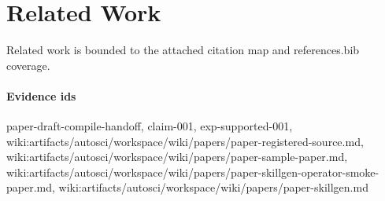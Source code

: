\section{Related Work}
Related work is bounded to the attached citation map and references.bib coverage.

\paragraph{Evidence ids} paper-draft-compile-handoff, claim-001, exp-supported-001, wiki:artifacts/autosci/workspace/wiki/papers/paper-registered-source.md, wiki:artifacts/autosci/workspace/wiki/papers/paper-sample-paper.md, wiki:artifacts/autosci/workspace/wiki/papers/paper-skillgen-operator-smoke-paper.md, wiki:artifacts/autosci/workspace/wiki/papers/paper-skillgen.md
